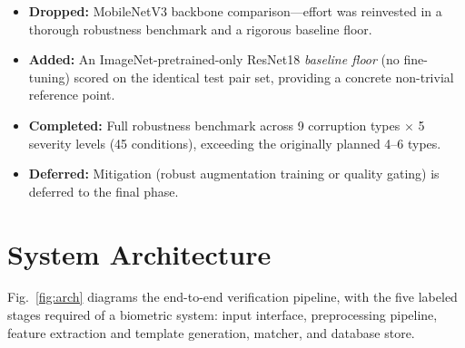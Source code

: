 \documentclass[conference]{IEEEtran}
\begin{document}
{\color{blue}
\begin{itemize}
    \item \textbf{Dropped:} MobileNetV3 backbone comparison---effort was reinvested in a thorough robustness benchmark and a rigorous baseline floor.
    \item \textbf{Added:} An ImageNet-pretrained-only ResNet18 \emph{baseline floor} (no fine-tuning) scored on the identical test pair set, providing a concrete non-trivial reference point.
    \item \textbf{Completed:} Full robustness benchmark across 9 corruption types $\times$ 5 severity levels (45 conditions), exceeding the originally planned 4--6 types.
    \item \textbf{Deferred:} Mitigation (robust augmentation training or quality gating) is deferred to the final phase.
\end{itemize}
}

\section{System Architecture}
\label{sec:arch}

Fig.~\ref{fig:arch} diagrams the end-to-end verification pipeline, with the five labeled stages required of a biometric system: input interface, preprocessing pipeline, feature extraction and template generation, matcher, and database store.
\end{document}
